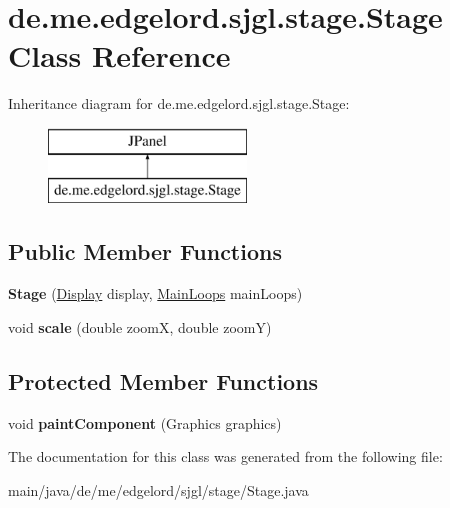 \hypertarget{classde_1_1me_1_1edgelord_1_1sjgl_1_1stage_1_1_stage}{}\section{de.\+me.\+edgelord.\+sjgl.\+stage.\+Stage Class Reference}
\label{classde_1_1me_1_1edgelord_1_1sjgl_1_1stage_1_1_stage}
Inheritance diagram for de.\+me.\+edgelord.\+sjgl.\+stage.\+Stage\+:\begin{figure}[H]
\begin{center}
\leavevmode
\includegraphics[height=2.000000cm]{classde_1_1me_1_1edgelord_1_1sjgl_1_1stage_1_1_stage}
\end{center}
\end{figure}
\subsection*{Public Member Functions}
\begin{DoxyCompactItemize}
\item 
\mbox{\label{classde_1_1me_1_1edgelord_1_1sjgl_1_1stage_1_1_stage_a07c65f09fff666e05392f54f28c63b60}} 
{\bfseries Stage} (\mbox{\hyperlink{classde_1_1me_1_1edgelord_1_1sjgl_1_1display_1_1_display}{Display}} display, \mbox{\hyperlink{classde_1_1me_1_1edgelord_1_1sjgl_1_1core_1_1_main_loops}{Main\+Loops}} main\+Loops)
\item 
\mbox{\label{classde_1_1me_1_1edgelord_1_1sjgl_1_1stage_1_1_stage_a383c81825eb6fc2184b0b713575c5ded}} 
void {\bfseries scale} (double zoomX, double zoomY)
\end{DoxyCompactItemize}
\subsection*{Protected Member Functions}
\begin{DoxyCompactItemize}
\item 
\mbox{\label{classde_1_1me_1_1edgelord_1_1sjgl_1_1stage_1_1_stage_a6355bf55cb39b9bb5c5112f86decfb76}} 
void {\bfseries paint\+Component} (Graphics graphics)
\end{DoxyCompactItemize}


The documentation for this class was generated from the following file\+:\begin{DoxyCompactItemize}
\item 
main/java/de/me/edgelord/sjgl/stage/Stage.\+java\end{DoxyCompactItemize}

